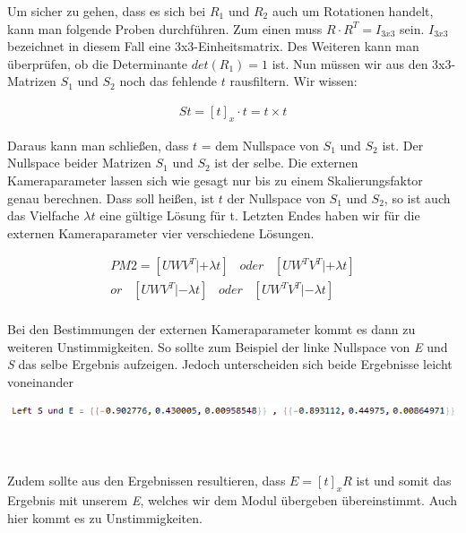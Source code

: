 Um sicher zu gehen, dass es sich bei \ensuremath{R_1} und \ensuremath{R_2} auch um Rotationen handelt, kann man folgende Proben durchführen. Zum einen muss \ensuremath{R\cdot R^T=I_{3x3}} sein. \ensuremath{I_{3x3}} bezeichnet in diesem Fall eine 3x3-Einheitsmatrix. Des Weiteren kann man überprüfen, ob die Determinante \ensuremath{det(R_1) = 1} ist. Nun müssen wir aus den 3x3-Matrizen \ensuremath{S_1} und \ensuremath{S_2} noch das fehlende \ensuremath{t} rausfiltern. Wir wissen:

\begin{gather}
St = [t]_x \cdot t = t \times t
\end{gather} 

Daraus kann man schließen, dass \ensuremath{t} = dem Nullspace von \ensuremath{S_1} und \ensuremath{S_2} ist. Der Nullspace beider Matrizen \ensuremath{S_1} und \ensuremath{S_2} ist der selbe. Die externen Kameraparameter lassen sich wie gesagt nur bis zu einem Skalierungsfaktor genau berechnen. Dass soll heißen, ist \ensuremath{t} der Nullspace von \ensuremath{S_1} und \ensuremath{S_2}, so ist auch das Vielfache \ensuremath{\lambda t} eine gültige Lösung für t. Letzten Endes haben wir für die externen Kameraparameter vier verschiedene Lösungen. 

\begin{gather}
PM2 = [UWV^T|+\lambda t] \;\;\; oder \;\;\;[UW^TV^T|+\lambda t]\\
or\;\;\; [UWV^T|-\lambda t] \;\;\; oder \;\;\;[UW^TV^T|-\lambda t]
\end{gather}\\

Bei den Bestimmungen der externen Kameraparameter kommt es dann zu weiteren Unstimmigkeiten. So sollte zum Beispiel der linke Nullspace von \textit{E} und \textit{S} das selbe Ergebnis aufzeigen. Jedoch unterscheiden sich beide Ergebnisse leicht voneinander \\

\begin{minipage}{\linewidth}
	\centering
	\includegraphics[width=1\linewidth]{images/LeftES.png}
\end{minipage}\\\\

Zudem sollte aus den Ergebnissen resultieren, dass \ensuremath{E = [t]_xR} ist und somit das Ergebnis mit unserem \textit{E}, welches wir dem Modul übergeben übereinstimmt. Auch hier kommt es zu Unstimmigkeiten.\\

